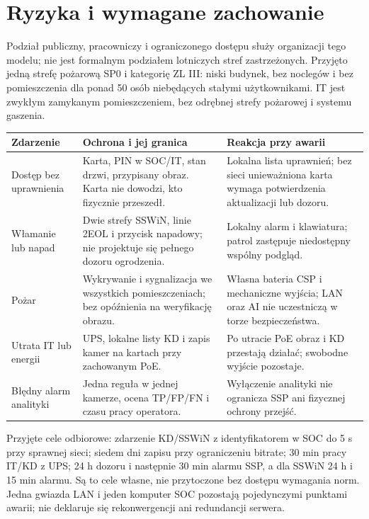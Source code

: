 \section{Ryzyka i wymagane zachowanie}
Podział publiczny, pracowniczy i ograniczonego dostępu służy organizacji tego modelu; nie jest formalnym podziałem lotniczych stref zastrzeżonych. Przyjęto jedną strefę pożarową SP0 i kategorię ZL III: niski budynek, bez noclegów i bez pomieszczenia dla ponad 50 osób niebędących stałymi użytkownikami. IT jest zwykłym zamykanym pomieszczeniem, bez odrębnej strefy pożarowej i systemu gaszenia.

\begin{tabularx}{\linewidth}{@{}P{32mm}Y Y@{}}
\toprule Zdarzenie & Ochrona i jej granica & Reakcja przy awarii\\\midrule
Dostęp bez uprawnienia & Karta, PIN w SOC/IT, stan drzwi, przypisany obraz. Karta nie dowodzi, kto fizycznie przeszedł. & Lokalna lista uprawnień; bez sieci unieważniona karta wymaga potwierdzenia aktualizacji lub dozoru.\\
Włamanie lub napad & Dwie strefy SSWiN, linie 2EOL i przycisk napadowy; nie projektuje się pełnego dozoru ogrodzenia. & Lokalny alarm i klawiatura; patrol zastępuje niedostępny wspólny podgląd.\\
Pożar & Wykrywanie i sygnalizacja we wszystkich pomieszczeniach; bez opóźnienia na weryfikację obrazu. & Własna bateria CSP i mechaniczne wyjścia; LAN oraz AI nie uczestniczą w torze bezpieczeństwa.\\
Utrata IT lub energii & UPS, lokalne listy KD i zapis kamer na kartach przy zachowanym PoE. & Po utracie PoE obraz i KD przestają działać; swobodne wyjście pozostaje.\\
Błędny alarm analityki & Jedna reguła w jednej kamerze, ocena TP/FP/FN i czasu pracy operatora. & Wyłączenie analityki nie ogranicza SSP ani fizycznej ochrony przejść.\\\bottomrule
\end{tabularx}

Przyjęte cele odbiorowe: zdarzenie KD/SSWiN z identyfikatorem w SOC do 5 s przy sprawnej sieci; siedem dni zapisu przy ograniczeniu bitrate; 30 min pracy IT/KD z UPS; 24 h dozoru i następnie 30 min alarmu SSP, a dla SSWiN 24 h i 15 min alarmu. Są to cele własne, nie przytoczone bez dostępu wymagania norm. Jedna gwiazda LAN i jeden komputer SOC pozostają pojedynczymi punktami awarii; nie deklaruje się rekonwergencji ani redundancji serwera.
